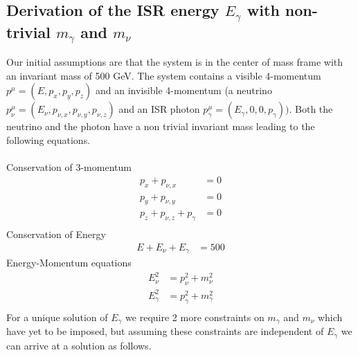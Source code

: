 \subsection{Derivation of the ISR energy ${E}_{\gamma}$ with non-trivial ${m}_{\gamma}$ and ${m}_{\nu}$}
\label{App:Derivation}

Our initial assumptions are that the system is in the center of mass frame with an invariant mass of 500 GeV. The system contains a visible 4-momentum ${p}^{\mu} = ( E,  {p}_{x}, {p}_{y}, {p}_{z})$ and an invisible 4-momentum (a neutrino ${p}^{\mu}_{\nu} = ( {E}_{\nu},  {p}_{\nu,x}, {p}_{\nu,y}, {p}_{\nu,z})$ and an ISR photon $ {p}^{\mu}_{\gamma} = ( {E}_{\gamma}, 0, 0,  {p}_{\gamma}) )$. Both the neutrino and the photon have a non trivial invariant mass leading to the following equations.\\\\
Conservation of 3-momentum
\begin{align}
{p}_{x} + {p}_{\nu,x}&=0\\
{p}_{y} + {p}_{\nu,y}&=0\\
{p}_{z} + {p}_{\nu,z} + {p}_{\gamma} &= 0\\
 \end{align}
Conservation of Energy
 \begin{align}
E + {E}_{\nu} + {E}_{\gamma} &= 500
 \end{align}
Energy-Momentum equations
 \begin{align}
{E}_{\nu}^{2} &= {p}_{\nu}^{2} +{m}_{\nu}^{2}\\
{E}_{\gamma}^{2} &= {p}_{\gamma}^{2} +{m}_{\gamma}^{2}\\
 \end{align}
For a unique solution of ${E}_{\gamma}$ we require 2 more constraints on ${m}_{\gamma}$ and ${m}_{\nu}$ which have yet to be imposed, but assuming these constraints are independent of ${E}_{\gamma}$ we can arrive at a solution as follows.\\

